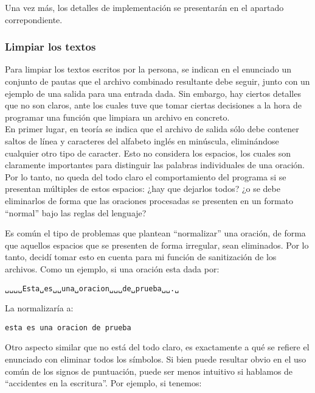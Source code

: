 \documentclass[a4paper]{article}
\begin{document}
Una vez más, los detalles de implementación se presentarán en el apartado correpondiente. %

\subsubsection{Limpiar los textos}

Para limpiar los textos escritos por la persona, se indican en el enunciado un conjunto de pautas que el archivo combinado resultante debe seguir, junto con un ejemplo de una salida para una entrada dada. Sin embargo, hay ciertos detalles que no son claros, ante los cuales tuve que tomar ciertas decisiones a la hora de programar una función que limpiara un archivo en concreto. \\

En primer lugar, en teoría se indica que el archivo de salida sólo debe contener saltos de línea y caracteres del alfabeto inglés en minúscula, eliminándose cualquier otro tipo de caracter. Esto no considera los espacios, los cuales son claramente importantes para distinguir las palabras individuales de una oración. Por lo tanto, no queda del todo claro el comportamiento del programa si se presentan múltiples de estos espacios: ¿hay que dejarlos todos? ¿o se debe eliminarlos de forma que las oraciones procesadas se presenten en un formato ``normal'' bajo las reglas del lenguaje?

Es común el tipo de problemas que plantean ``normalizar'' una oración, de forma que aquellos espacios que se presenten de forma irregular, sean eliminados. Por lo tanto, decidí tomar esto en cuenta para mi función de sanitización de los archivos. Como un ejemplo, si una oración esta dada por:

\begin{tcolorbox}
    \texttt{␣␣␣␣Esta␣es␣␣una␣oracion␣␣␣de␣prueba␣␣.␣}
\end{tcolorbox}

\noindent{}La normalizaría a:

\begin{tcolorbox}
    \texttt{esta es una oracion de prueba}
\end{tcolorbox}

\vspace{10pt}

Otro aspecto similar que no está del todo claro, es exactamente a qué se refiere el enunciado con eliminar todos los símbolos. Si bien puede resultar obvio en el uso común de los signos de puntuación, puede ser menos intuitivo si hablamos de ``accidentes en la escritura''. Por ejemplo, si tenemos:
\end{document}
